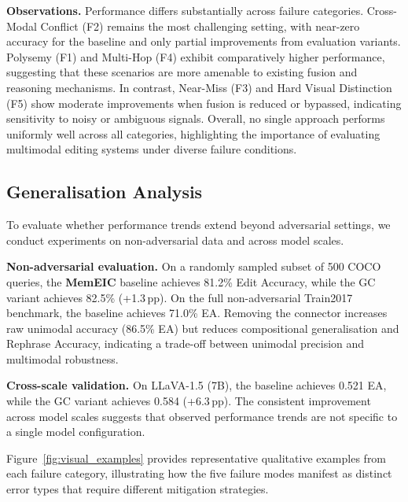 \documentclass{article}
\newcommand{\memeic}{\textbf{MemEIC}}
\begin{document}
\textbf{Observations.}
Performance differs substantially across failure categories. Cross-Modal Conflict (F2) remains the most challenging setting, with near-zero accuracy for the baseline and only partial improvements from evaluation variants. Polysemy (F1) and Multi-Hop (F4) exhibit comparatively higher performance, suggesting that these scenarios are more amenable to existing fusion and reasoning mechanisms. In contrast, Near-Miss (F3) and Hard Visual Distinction (F5) show moderate improvements when fusion is reduced or bypassed, indicating sensitivity to noisy or ambiguous signals. Overall, no single approach performs uniformly well across all categories, highlighting the importance of evaluating multimodal editing systems under diverse failure conditions.




\subsection{Generalisation Analysis}
\label{sec:generalisation}

To evaluate whether performance trends extend beyond adversarial settings, we conduct experiments on non-adversarial data and across model scales.

\textbf{Non-adversarial evaluation.}
\label{sec:non_adv}
On a randomly sampled subset of 500 COCO queries, the \memeic{} baseline achieves 81.2\% Edit Accuracy, while the GC variant achieves 82.5\% (+1.3\,pp). On the full non-adversarial Train2017 benchmark, the baseline achieves 71.0\% EA. Removing the connector increases raw unimodal accuracy (86.5\% EA) but reduces compositional generalisation and Rephrase Accuracy, indicating a trade-off between unimodal precision and multimodal robustness.

\textbf{Cross-scale validation.}
\label{sec:scale}
On LLaVA-1.5 (7B), the baseline achieves 0.521 EA, while the GC variant achieves 0.584 (+6.3\,pp). The consistent improvement across model scales suggests that observed performance trends are not specific to a single model configuration.

Figure~\ref{fig:visual_examples} provides representative qualitative examples from each failure category, illustrating how the five failure modes manifest as distinct error types that require different mitigation strategies.
\end{document}
